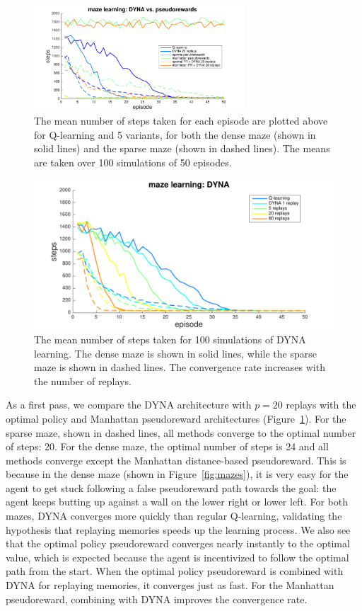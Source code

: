 \documentclass[notitlepage]{article}
\begin{document}
\begin{figure}[ht]
\centering
\includegraphics[width=0.7\textwidth]{modelCompareNoNoise}
\caption{The mean number of steps taken for each episode are plotted above for Q-learning and 5 variants, for both the dense maze (shown in solid lines) and the sparse maze (shown in dashed lines). The means are taken over 100 simulations of 50 episodes.}
\label{fig:model-compare}
\end{figure}

\begin{figure}[t]
\centering
\includegraphics[width=-0.7\textwidth]{DYNAcompare.pdf}
\caption{The mean number of steps taken for 100 simulations of DYNA learning. The dense maze is shown in solid lines, while the sparse maze is shown in dashed lines. The convergence rate increases with the number of replays.}
\label{fig:dyna-compare}
\end{figure}

As a first pass, we compare the DYNA architecture with $p =20$ replays with the optimal policy and Manhattan pseudoreward architectures (Figure~\ref{fig:model-compare}). For the sparse maze, shown in dashed lines, all methods converge to the optimal number of steps: 20. For the dense maze, the optimal number of steps is 24 and all methods converge except the Manhattan distance-based pseudoreward. This is because in the dense maze (shown in Figure~\ref{fig:mazes}), it is very easy for the agent to get stuck following a false pseudoreward path towards the goal: the agent keeps butting up against a wall on the lower right or lower left. For both mazes, DYNA converges more quickly than regular Q-learning, validating the hypothesis that replaying memories speeds up the learning process. We also see that the optimal policy pseudoreward converges nearly instantly to the optimal value, which is expected because the agent is incentivized to follow the optimal path from the start. When the optimal policy pseudoreward is combined with DYNA for replaying memories, it converges just as fast. For the Manhattan pseudoreward, combining with DYNA improves the convergence rate. 
\end{document}
